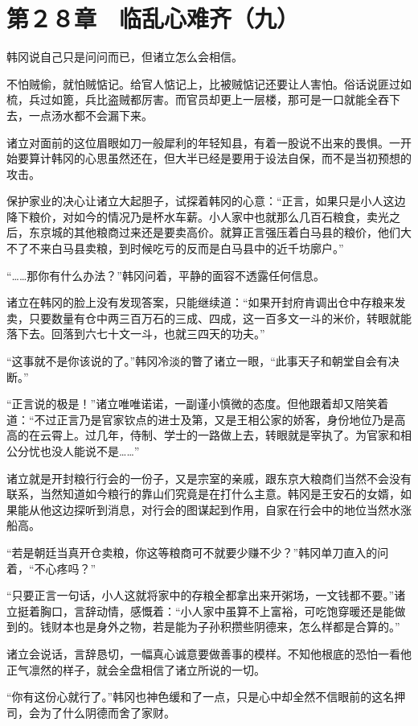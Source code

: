 \section{第２８章　临乱心难齐（九）}

韩冈说自己只是问问而已，但诸立怎么会相信。

不怕贼偷，就怕贼惦记。给官人惦记上，比被贼惦记还要让人害怕。俗话说匪过如梳，兵过如篦，兵比盗贼都厉害。而官员却更上一层楼，那可是一口就能全吞下去，一点汤水都不会漏下来。

诸立对面前的这位眉眼如刀一般犀利的年轻知县，有着一股说不出来的畏惧。一开始要算计韩冈的心思虽然还在，但大半已经是要用于设法自保，而不是当初预想的攻击。

保护家业的决心让诸立大起胆子，试探着韩冈的心意：“正言，如果只是小人这边降下粮价，对如今的情况乃是杯水车薪。小人家中也就那么几百石粮食，卖光之后，东京城的其他粮商过来还是要卖高价。就算正言强压着白马县的粮价，他们大不了不来白马县卖粮，到时候吃亏的反而是白马县中的近千坊廓户。”

“……那你有什么办法？”韩冈问着，平静的面容不透露任何信息。

诸立在韩冈的脸上没有发现答案，只能继续道：“如果开封府肯调出仓中存粮来发卖，只要数量有仓中两三百万石的三成、四成，这一百多文一斗的米价，转眼就能落下去。回落到六七十文一斗，也就三四天的功夫。”

“这事就不是你该说的了。”韩冈冷淡的瞥了诸立一眼，“此事天子和朝堂自会有决断。”

“正言说的极是！”诸立唯唯诺诺，一副谨小慎微的态度。但他跟着却又陪笑着道：“不过正言乃是官家钦点的进士及第，又是王相公家的娇客，身份地位乃是高高的在云霄上。过几年，侍制、学士的一路做上去，转眼就是宰执了。为官家和相公分忧也没人能说不是……”

诸立就是开封粮行行会的一份子，又是宗室的亲戚，跟东京大粮商们当然不会没有联系，当然知道如今粮行的靠山们究竟是在打什么主意。韩冈是王安石的女婿，如果能从他这边探听到消息，对行会的图谋起到作用，自家在行会中的地位当然水涨船高。

“若是朝廷当真开仓卖粮，你这等粮商可不就要少赚不少？”韩冈单刀直入的问着，“不心疼吗？”

“只要正言一句话，小人这就将家中的存粮全都拿出来开粥场，一文钱都不要。”诸立挺着胸口，言辞动情，感慨着：“小人家中虽算不上富裕，可吃饱穿暖还是能做到的。钱财本也是身外之物，若是能为子孙积攒些阴德来，怎么样都是合算的。”

诸立会说话，言辞恳切，一幅真心诚意要做善事的模样。不知他根底的恐怕一看他正气凛然的样子，就会全盘相信了诸立所说的一切。

“你有这份心就行了。”韩冈也神色缓和了一点，只是心中却全然不信眼前的这名押司，会为了什么阴德而舍了家财。

